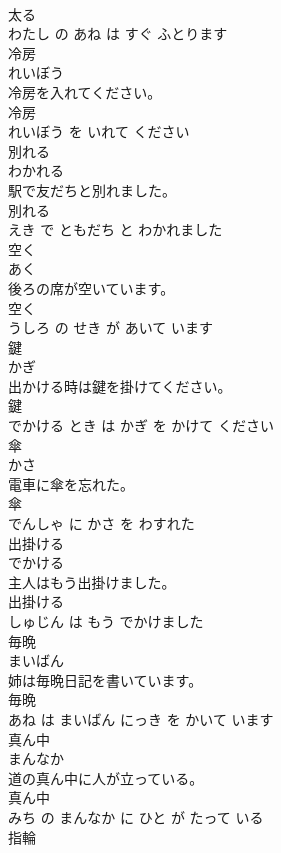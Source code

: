 \documentclass[8pt]{extreport}
\begin{document}
\begin{CJK}{UTF8}{min}
\\	太る 
\\	わたし の あね は すぐ ふとります			
\\	冷房	
\\	れいぼう			
\\	冷房を入れてください。	
\\	冷房 
\\	れいぼう を いれて ください			
\\	別れる	
\\	わかれる			
\\	駅で友だちと別れました。	
\\	別れる 
\\	えき で ともだち と わかれました			
\\	空く	
\\	あく			
\\	後ろの席が空いています。	
\\	空く 
\\	うしろ の せき が あいて います			
\\	鍵	
\\	かぎ			
\\	出かける時は鍵を掛けてください。	
\\	鍵 
\\	でかける とき は かぎ を かけて ください			
\\	傘	
\\	かさ			
\\	電車に傘を忘れた。	
\\	傘 
\\	でんしゃ に かさ を わすれた			
\\	出掛ける	
\\	でかける			
\\	主人はもう出掛けました。	
\\	出掛ける 
\\	しゅじん は もう でかけました			
\\	毎晩	
\\	まいばん			
\\	姉は毎晩日記を書いています。	
\\	毎晩 
\\	あね は まいばん にっき を かいて います			
\\	真ん中	
\\	まんなか			
\\	道の真ん中に人が立っている。	
\\	真ん中 
\\	みち の まんなか に ひと が たって いる			
\\	指輪	

\end{CJK}
\end{document}
